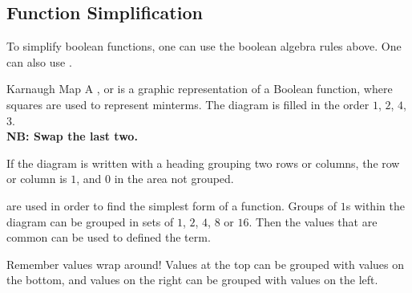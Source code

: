 \documentclass[../notes.tex]{subfiles}
\begin{document}
			\subsection{Function Simplification}
				To simplify boolean functions, one can use the boolean algebra rules above. One can also use .
				\begin{definition}{Karnaugh Map}
					A , or  is a graphic representation of a Boolean function, where squares are used to represent minterms. The diagram is filled in the order $1$, $2$, $4$, $3$.\\
					\textbf{NB: Swap the last two.}
					\begin{center}
						\begin{karnaugh-map}[2][2][1][$B$][$A$]
						\end{karnaugh-map}
						\begin{karnaugh-map}[4][2][1][$C$][$B$][$A$]
						\end{karnaugh-map}
						\begin{karnaugh-map}[4][4][1][$D$][$C$][$B$][$A$]
						\end{karnaugh-map}
					\end{center}
					If the diagram is written with a heading grouping two rows or columns, the row or column is $1$, and $0$ in the area not grouped.
				\end{definition}
				 are used in order to find the simplest form of a function. Groups of $1$s within the diagram can be grouped in sets of $1$, $2$, $4$, $8$ or $16$. Then the values that are common can be used to defined the term.
				\begin{sidenote}{Remember values wrap around!}
					Values at the top can be grouped with values on the bottom, and values on the right can be grouped with values on the left.
				\end{sidenote}
				\pagebreak
\end{document}
